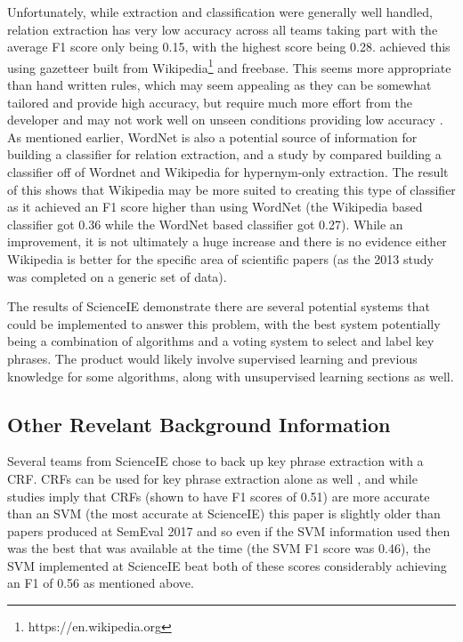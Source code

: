 Unfortunately, while extraction and classification were generally well handled, relation extraction has very low accuracy across all teams taking part with the average F1 score only being 0.15, with the highest score being 0.28. \cite{Ammar2017} achieved this using gazetteer built from Wikipedia\footnote{https://en.wikipedia.org} and freebase. This seems more appropriate than hand written rules, which may seem appealing as they can be somewhat tailored and provide high accuracy, but require much more effort from the developer and may not work well on unseen conditions providing low accuracy \cite{Manning2012}. As mentioned earlier, WordNet is also a potential source of information for building a classifier for relation extraction, and a study by \cite{Snow2013} compared building a classifier off of Wordnet and Wikipedia for hypernym-only extraction. The result of this shows that Wikipedia may be more suited to creating this type of classifier as it achieved an F1 score higher than using WordNet (the Wikipedia based classifier got 0.36 while the WordNet based classifier got 0.27). While an improvement, it is not ultimately a huge increase and there is no evidence either Wikipedia is better for the specific area of scientific papers (as the 2013 study was completed on a generic set of data).

The results of ScienceIE demonstrate there are several potential systems that could be implemented to answer this problem, with the best system potentially being a combination of algorithms and a voting system to select and label key phrases. The product would likely involve supervised learning and previous knowledge for some algorithms, along with unsupervised learning sections as well.

\subsection{Other Revelant Background Information}

Several teams from ScienceIE chose to back up key phrase extraction with a CRF. CRFs can be used for key phrase extraction alone as well \cite{Zhang2008}, and while studies imply that CRFs (shown to have F1 scores of 0.51) are more accurate than an SVM (the most accurate at ScienceIE) this paper is slightly older than papers produced at SemEval 2017 and so even if the SVM information used then was the best that was available at the time (the SVM F1 score was 0.46), the SVM implemented at ScienceIE beat both of these scores considerably achieving an F1 of 0.56 as mentioned above.

